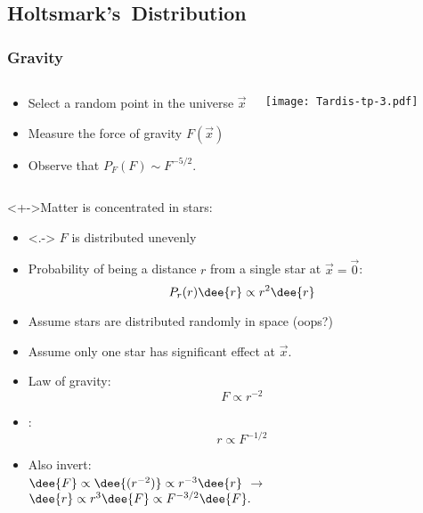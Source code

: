 % 
% 


\subsection{Holtsmark's\ Distribution}


\begin{frame}
  \frametitle{Gravity}
  
  \begin{columns}
    \begin{block}{}
    \begin{itemize}
    \item<+-> 
      Select a random point in the universe $\vec{x}$
    \item<+-> 
      Measure the force of gravity $F(\vec{x})$
    \item<+-> 
      Observe that $P_F(F) \sim F^{-5/2}$.
    \end{itemize}
    \end{block}
    \texttt{[image: Tardis-tp-3.pdf]}
  \end{columns}

\end{frame}


\begin{frame}

  \begin{block}<+->{Matter is concentrated in stars:\cite{sornette2003a}}
    \begin{itemize}
    \item<.-> 
      $F$ is distributed unevenly
    \item<+-> 
      Probability of being a distance $r$ from a
      single star at $\vec{x} = \vec{0}$:
      $$ P_r(r) \dee{r} \propto r^{2} \dee{r} $$
    \item<+-> 
      Assume stars are distributed randomly in space (oops?)
    \item<+-> 
      Assume only one star has significant effect at $\vec{x}$.
    \item<+-> 
      Law of gravity: $$ F \propto r^{-2} $$
    \item<+-> 
      : $$ r \propto F^{-1/2} $$
    \item<+->
      Also invert:\\
      $ \dee{F} \propto \dee{(r^{-2})} \propto r^{-3} \dee{r} $
      $\rightarrow $
      $ \dee{r} \propto r^3 \dee{F} \propto F^{-3/2} \dee{F}.$
    \end{itemize}
  \end{block}

\end{frame}


